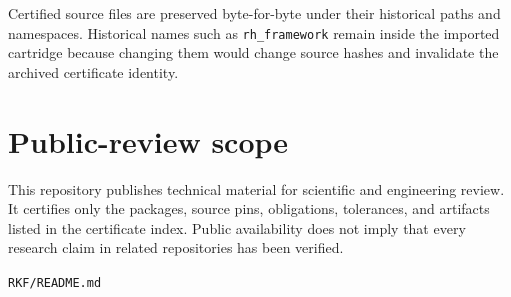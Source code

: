 Certified source files are preserved byte-for-byte under their historical paths and namespaces. Historical names such as \texttt{rh\_framework} remain inside the imported cartridge because changing them would change source hashes and invalidate the archived certificate identity.

\hypertarget{public-review-scope}{%
\section{Public-review scope}\label{public-review-scope}}

This repository publishes technical material for scientific and engineering review. It certifies only the packages, source pins, obligations, tolerances, and artifacts listed in the certificate index. Public availability does not imply that every research claim in related repositories has been verified.

\begin{flushright}\small\texttt{RKF/README.md}\end{flushright}
